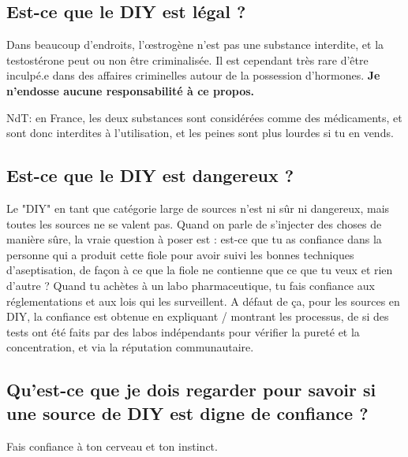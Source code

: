 \documentclass{article}
\begin{document}
\subsection{Est-ce que le DIY est légal ?}\label{6-11}

Dans beaucoup d'endroits, l'œstrogène n'est pas une substance interdite, et la testostérone peut ou non être criminalisée. Il est cependant très rare d'être inculpé.e dans des affaires criminelles autour de la possession d'hormones. \textbf{Je n'endosse aucune responsabilité à ce propos.} 

NdT: en France, les deux substances sont considérées comme des médicaments, et sont donc interdites à l'utilisation, et les peines sont plus lourdes si tu en vends.

\subsection{Est-ce que le DIY est dangereux ?}

Le "DIY" en tant que catégorie large de sources n'est ni sûr ni dangereux, mais toutes les sources ne se valent pas. Quand on parle de s'injecter des choses de manière sûre, la vraie question à poser est : est-ce que tu as confiance dans la personne qui a produit cette fiole pour avoir suivi les bonnes techniques d'aseptisation, de façon à ce que la fiole ne contienne que ce que tu veux et rien d'autre ? Quand tu achètes à un labo pharmaceutique, tu fais confiance aux réglementations et aux lois qui les surveillent. A défaut de ça, pour les sources en DIY, la confiance est obtenue en expliquant / montrant les processus, de si des tests ont été faits par des labos indépendants pour vérifier la pureté et la concentration, et via la réputation communautaire.  

\subsection{Qu'est-ce que je dois regarder pour savoir si une source de DIY est digne de confiance ?}

Fais confiance à ton cerveau et ton instinct.
\end{document}
